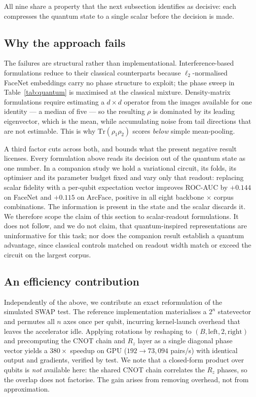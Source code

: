 \documentclass[journal,12pt]{IEEEtran}
\begin{document}
All nine share a property that the next subsection identifies as decisive: each
compresses the quantum state to a single scalar before the decision is made.

\subsection{Why the approach fails}

The failures are structural rather than implementational. Interference-based
formulations reduce to their classical counterparts because $\ell_2$-normalised
FaceNet embeddings carry no phase structure to exploit; the phase sweep in
Table~\ref{tab:quantum} is maximised at the classical mixture. Density-matrix
formulations require estimating a $d \times d$ operator from the images
available for one identity --- a median of five --- so the resulting $\rho$ is
dominated by its leading eigenvector, which is the mean, while accumulating
noise from tail directions that are not estimable. This is why
$\mathrm{Tr}(\rho_1\rho_2)$ scores \emph{below} simple mean-pooling.

A third factor cuts across both, and bounds what the present negative result
licenses. Every formulation above reads its decision out of the quantum state as
one number. In a companion study we hold a variational circuit, its folds, its
optimiser and its parameter budget fixed and vary only that readout: replacing
scalar fidelity with a per-qubit expectation vector improves ROC-AUC by $+0.144$
on FaceNet and $+0.115$ on ArcFace, positive in all eight backbone $\times$
corpus combinations. The information is present in the state and the scalar
discards it. We therefore scope the claim of this section to scalar-readout
formulations. It does not follow, and we do not claim, that quantum-inspired
representations are uninformative for this task; nor does the companion result
establish a quantum advantage, since classical controls matched on readout width
match or exceed the circuit on the largest corpus.

\subsection{An efficiency contribution}

Independently of the above, we contribute an exact reformulation of the
simulated SWAP test. The reference implementation materialises a $2^n$
statevector and permutes all $n$ axes once per qubit, incurring kernel-launch
overhead that leaves the accelerator idle. Applying rotations by reshaping to
$(B, \text{left}, 2, \text{right})$ and precomputing the CNOT chain and $R_z$
layer as a single diagonal phase vector yields a $380\times$ speedup on GPU
($192 \to 73{,}094$ pairs/s) with identical output and gradients, verified by
test. We note that a closed-form product over qubits is \emph{not} available
here: the shared CNOT chain correlates the $R_z$ phases, so the overlap does not
factorise. The gain arises from removing overhead, not from approximation.
\end{document}
